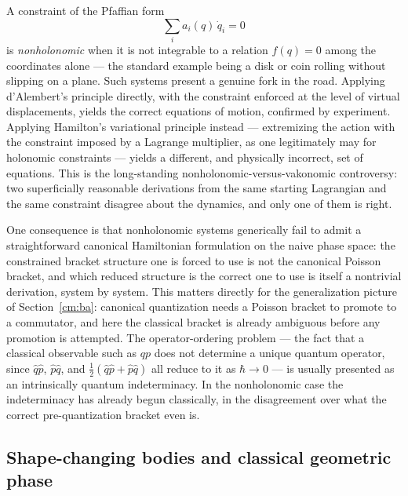 A constraint of the Pfaffian form
\begin{equation}
  \sum_i a_i(q)\,\dot q_i = 0
\end{equation}
is \emph{nonholonomic} when it is not integrable to a relation $f(q)=0$ among the
coordinates alone --- the standard example being a disk or coin rolling without
slipping on a plane. Such systems present a genuine fork in the road. Applying
d'Alembert's principle directly, with the constraint enforced at the level of
virtual displacements, yields the correct equations of motion, confirmed by
experiment. Applying Hamilton's variational principle instead --- extremizing the
action with the constraint imposed by a Lagrange multiplier, as one legitimately
may for holonomic constraints --- yields a different, and physically incorrect,
set of equations. This is the long-standing nonholonomic-versus-vakonomic
controversy: two superficially reasonable derivations from the same starting
Lagrangian and the same constraint disagree about the dynamics, and only one of
them is right.

One consequence is that nonholonomic systems generically fail to admit a
straightforward canonical Hamiltonian formulation on the naive phase space:
the constrained bracket structure one is forced to use is not the canonical
Poisson bracket, and which reduced structure is the correct one to use is itself
a nontrivial derivation, system by system. This matters directly for the
generalization picture of Section~\ref{cm:ba}: canonical quantization
needs a Poisson bracket to promote to a commutator, and here the classical
bracket is already ambiguous before any promotion is attempted. The
operator-ordering problem --- the fact that a classical observable such as $qp$
does not determine a unique quantum operator, since $\hat q\hat p$, $\hat p\hat
q$, and $\tfrac12(\hat q\hat p+\hat p\hat q)$ all reduce to it as $\hbar\to0$
--- is usually presented as an intrinsically quantum indeterminacy. In the
nonholonomic case the indeterminacy has already begun classically, in the
disagreement over what the correct pre-quantization bracket even is.

\subsection{Shape-changing bodies and classical geometric phase}

